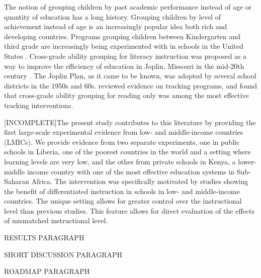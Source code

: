 \documentclass[11pt]{article}
\begin{document}
The notion of grouping children by past academic performance instead of age or quantity of education has a long history. Grouping children by level of achievement instead of age is an increasingly popular idea both rich and developing countries. Programs grouping children between Kindergarten and third grade are increasingly being experimented with in schools in the United States \citep{edweek20191106}. Cross-grade ability grouping for literacy instruction was proposed as a way to improve the efficiency of education in Joplin, Missouri in the mid-20th century \citep{floyd:1954}. The Joplin Plan, as it came to be known, was adopted by several school districts in the 1950s and 60s. \cite{slavin:1987} reviewed evidence on tracking programs, and found that cross-grade ability grouping for reading only was among the most effective tracking interventions. 

[INCOMPLETE]The present study contributes to this literature by providing the first large-scale experimental evidence from low- and middle-income countries (LMICs). We provide evidence from two separate experiments, one in public schools in Liberia, one of the poorest countries in the world and a setting where learning levels are very low, and the other from private schools in Kenya, a lower-middle income country with one of the most effective education systems in Sub-Saharan Africa. The intervention was specifically motivated by studies showing the benefit of differentiated instruction in schools in low- and middle-income countries. The unique setting allows for greater control over the instructional level than previous studies. This feature allows for direct evaluation of the effects of mismatched instructional level. 

RESULTS PARAGRAPH

SHORT DISCUSSION PARAGRAPH

ROADMAP PARAGRAPH

\end{document}
